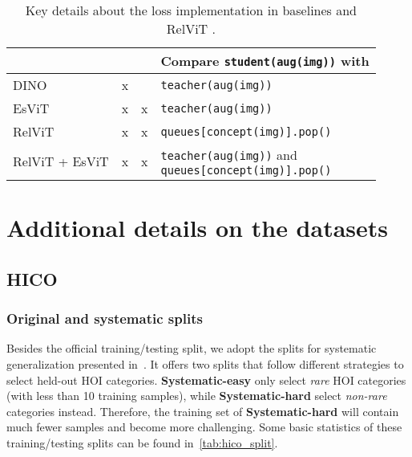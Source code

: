 \documentclass{article} \usepackage{iclr2022_conference,times}
\newcommand{\relvit}{RelViT }
\begin{document}
\begin{table}[h]
\centering
\caption{Key details about the loss implementation in baselines and \relvit.}
\begin{tabular}{llll}
\toprule
               &  &  & Compare \texttt{student(aug(img))} with                                                 \\ \midrule
DINO           & x                               &                                                                              & \texttt{teacher(aug(img))}                                                              \\
EsViT          & x                               & x                                                                            & \texttt{teacher(aug(img))}                                                              \\
RelViT         & x                               & x                                                                            & \texttt{queues{[}concept(img){]}.pop()}                                                 \\
RelViT + EsViT & x                               & x                                                                            & \makecell[tl]{\texttt{teacher(aug(img))} and\\ \texttt{queues{[}concept(img){]}.pop()}} \\ \bottomrule
\end{tabular}
\label{tab:baselines}
\end{table}

\section{Additional details on the datasets}

\subsection{HICO}

\subsubsection{Original and systematic splits}
Besides the official training/testing split, we adopt the splits for systematic generalization presented in~\citep{vcl}. It offers two splits that follow different strategies to select held-out HOI categories. \textbf{Systematic-easy} only select \textit{rare} HOI categories (with less than 10 training samples), while \textbf{Systematic-hard} select \textit{non-rare} categories instead. Therefore, the training set of \textbf{Systematic-hard} will contain much fewer samples and become more challenging. Some basic statistics of these training/testing splits can be found in~\autoref{tab:hico_split}.
\end{document}
